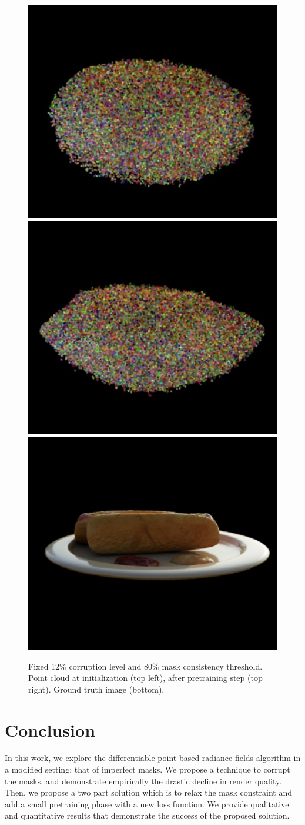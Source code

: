 \documentclass[10pt,twocolumn,letterpaper]{article}
\begin{document}
\begin{figure}[h]
\centering
    \includegraphics[width=0.45\linewidth]{figures/c12f80-b4pretrain.png}
    \includegraphics[width=0.45\linewidth]{figures/c12f80-afterpretrain.png}
    \includegraphics[width=0.45\linewidth]{figures/c12f80-gt.png}
    \caption{Fixed 12\% corruption level and 80\% mask consistency threshold. Point cloud at initialization (top left), after pretraining step (top right). Ground truth image (bottom).}
\label{fig:pretrainingviz}
\end{figure}

\section{Conclusion}


In this work, we explore the differentiable point-based radiance fields algorithm in a modified setting: that of imperfect masks. We propose a technique to corrupt the masks, and demonstrate empirically the drastic decline in render quality. Then, we propose a two part solution which is to relax the mask constraint and add a small pretraining phase with a new loss function. We provide qualitative and quantitative results that demonstrate the success of the proposed solution.
\end{document}
